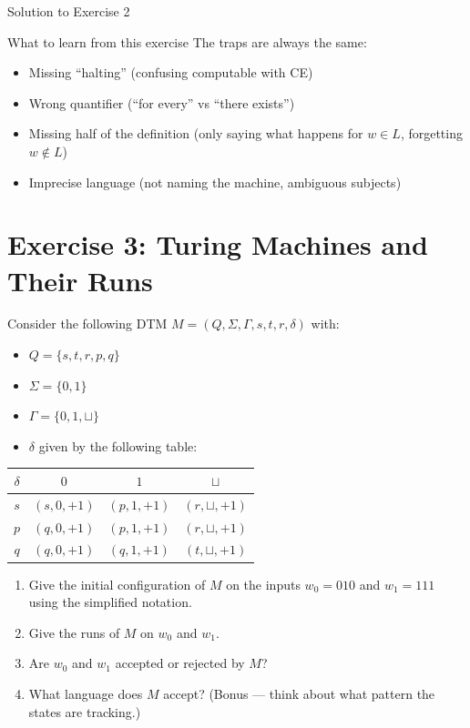\documentclass[11pt,a4paper]{article}
\newcommand{\blank}{\sqcup}
\begin{document}
\begin{solutionbox}{Solution to Exercise 2}
\begin{hintbox}{What to learn from this exercise}
The traps are always the same:
\begin{itemize}
    \item Missing ``halting'' (confusing computable with CE)
    \item Wrong quantifier (``for every'' vs ``there exists'')
    \item Missing half of the definition (only saying what happens for $w \in L$, forgetting $w \notin L$)
    \item Imprecise language (not naming the machine, ambiguous subjects)
\end{itemize}
\end{hintbox}
\end{solutionbox}

\newpage

\section*{Exercise 3: Turing Machines and Their Runs}

Consider the following DTM $M = (Q, \Sigma, \Gamma, s, t, r, \delta)$ with:

\begin{itemize}
    \item $Q = \{s, t, r, p, q\}$
    \item $\Sigma = \{0, 1\}$
    \item $\Gamma = \{0, 1, \blank\}$
    \item $\delta$ given by the following table:
\end{itemize}

\begin{center}
\begin{tabular}{c|c|c|c}
$\delta$ & $0$ & $1$ & $\blank$ \\
\hline
$s$ & $(s, 0, +1)$ & $(p, 1, +1)$ & $(r, \blank, +1)$ \\
$p$ & $(q, 0, +1)$ & $(p, 1, +1)$ & $(r, \blank, +1)$ \\
$q$ & $(q, 0, +1)$ & $(q, 1, +1)$ & $(t, \blank, +1)$ \\
\end{tabular}
\end{center}

\begin{enumerate}
    \item Give the initial configuration of $M$ on the inputs $w_0 = 010$ and $w_1 = 111$ using the simplified notation.

    \item Give the runs of $M$ on $w_0$ and $w_1$.

    \item Are $w_0$ and $w_1$ accepted or rejected by $M$?

    \item What language does $M$ accept? (Bonus --- think about what pattern the states are tracking.)
\end{enumerate}
\end{document}
